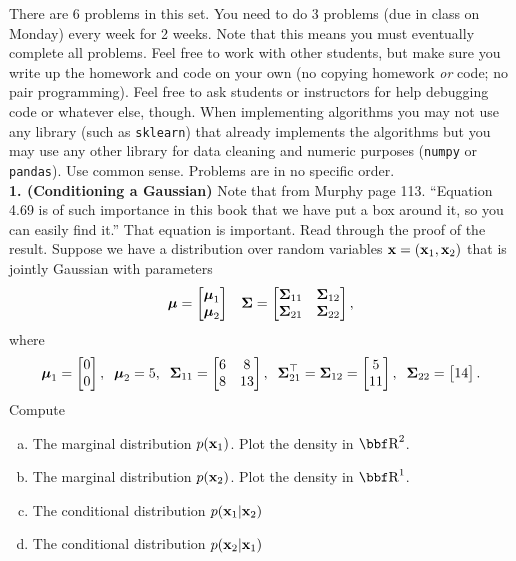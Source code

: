 \documentclass[12pt,letterpaper,fleqn]{hmcpset}
\begin{document}
There are 6 problems in this set. You need to do 3 problems (due in class on Monday)
every week for 2 weeks. Note that this means you must eventually complete all problems.
Feel free to work with other students, but make sure you write up the homework
and code on your own (no copying homework \textit{or} code; no pair programming).
Feel free to ask students or instructors for help debugging code or whatever else,
though.
When implementing algorithms you may not use any library (such as \texttt{sklearn})
that already implements the algorithms but you may use any other library for
data cleaning and numeric purposes (\texttt{numpy} or \texttt{pandas}). Use common
sense. Problems are in no specific order.\\[1em]

\textbf{1. (Conditioning a Gaussian)} Note that from Murphy page 113. ``Equation 4.69
is of such importance in this book that we have put a box around it, so you can easily
find it.'' That equation is important. Read through the proof of the result.
Suppose we have a distribution over random variables ${\bf x} = ({\bf x}_1, {\bf x}_2)$ that is
jointly Gaussian with parameters
\[
    \hbox{\boldmath$\mu$} = \begin{bmatrix} \hbox{\boldmath$\mu$}_1\\\hbox{\boldmath$\mu$}_2 \end{bmatrix}\;\;\; \hbox{\boldmath$\Sigma$} = \begin{bmatrix} \hbox{\boldmath$\Sigma$}_{11}&\hbox{\boldmath$\Sigma$}_{12}\\\hbox{\boldmath$\Sigma$}_{21}&\hbox{\boldmath$\Sigma$}_{22} \end{bmatrix},
\]
where
\[
    \hbox{\boldmath$\mu$}_1 = \begin{bmatrix} 0\\0 \end{bmatrix}, \;\; \hbox{\boldmath$\mu$}_2 = 5, \;\; \hbox{\boldmath$\Sigma$}_{11} = \begin{bmatrix} 6 & 8\\ 8 & 13 \end{bmatrix}, \;\; \hbox{\boldmath$\Sigma$}_{21}^\top = \hbox{\boldmath$\Sigma$}_{12} = \begin{bmatrix} 5\\11 \end{bmatrix}, \;\; \hbox{\boldmath$\Sigma$}_{22} = \begin{bmatrix} 14 \end{bmatrix}.
\]
Compute
\begin{enumerate}[(a)]
    \item The marginal distribution $p({\bf x}_1)$. Plot the density in $\RR^2$.
    \item The marginal distribution $p({\bf x}_2)$. Plot the density in $\RR^1$.
    \item The conditional distribution $p({\bf x}_1 | {\bf x}_2)$
    \item The conditional distribution $p({\bf x}_2 | {\bf x}_1)$\\[1em]
\end{enumerate}
\end{document}
